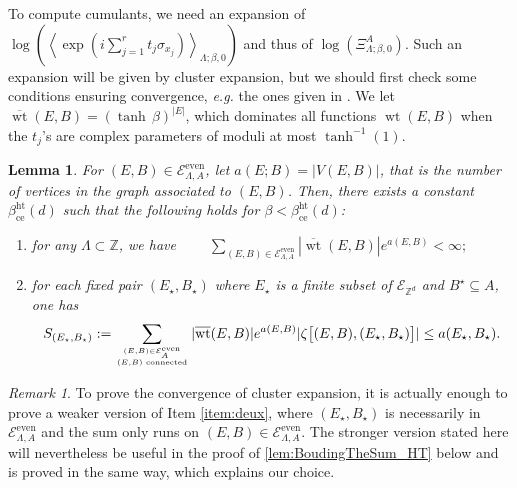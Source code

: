 \documentclass{amsart}
\newcommand{\field}[1]{\mathbb{#1}}
\newcommand{\Z}{\field{Z}}
\DeclareMathOperator\wt{wt}
\numberwithin{equation}{section}
\newtheorem{lemma}[theorem]{Lemma}
\theoremstyle{remark}
\newtheorem{remark}[theorem]{Remark}
\begin{document}
To compute cumulants, we need an expansion of 
$\log\left(\left\langle \exp\left(i \sum_{j=1}^r t_j \sigma_{x_j} \right) \right\rangle_{\Lambda;\beta,0} \right)$
and thus of $\log(\Xi^A_{\Lambda;\beta,0})$.
Such an expansion will be given by cluster expansion, but we should first check some conditions
ensuring convergence, {\em e.g.} the ones given in \cite[Section 5.4]{Velenik}.
We let $\overline{\wt}(E,B)=(\tanh\, \beta)^{|E|}$,
which dominates all functions $\wt(E,B)$ when the $t_j$'s are complex parameters
of moduli at most $\tanh^{-1}(1)$.
\begin{lemma}\label{lem:Cv_CE_HighTemperature}
For $(E,B) \in \mathcal{E}^{\text{even}}_{\Lambda,A}$, let $a(E;B)=|V(E,B)|$,
that is the number of vertices in the graph associated to $(E,B)$.
Then, there exists a constant $\beta^{\text{ht}}_{\text{ce}}(d)$ such that the following holds for $\beta<\beta^{\text{ht}}_{\text{ce}}(d)$:
\begin{enumerate}
\item for any $\Lambda \subset \Z$, we have $\displaystyle \qquad \sum_{(E,B) \in \mathcal{E}^{\text{even}}_{\Lambda,A}} |\overline{\wt}(E,B)| e^{a(E,B)}  < \infty ; $
\item \label{item:deux} for each fixed pair $(E_\star,B_\star)$ where $E_\star$ is a finite subset of $\mathcal{E}_{\Z^d}$
  and $B^\star \subseteq A$, one has
\[ S_{(E_\star,B_\star)}:=\sum_{(E,B) \in \mathcal{E}^{\text{even}}_{A} \atop (E,B) \text{ connected}} |\overline{\wt}(E,B)| e^{a(E,B)}
|\zeta\big[(E,B),(E_\star,B_\star)\big]| \le a(E_\star,B_\star).\]
\end{enumerate}
\end{lemma}
\begin{remark}
  To prove the convergence of cluster expansion, it is actually enough to prove a weaker version of Item \eqref{item:deux},
  where $(E_\star,B_\star)$ is necessarily in $\mathcal{E}^{\text{even}}_{\Lambda,A}$ and the sum only runs
  on $(E,B) \in \mathcal{E}^{\text{even}}_{\Lambda,A}$. 
  The stronger version stated here will nevertheless be useful in the proof of \cref{lem:BoudingTheSum_HT} below
  and is proved in the same way, which explains our choice.
\end{remark}
\end{document}
